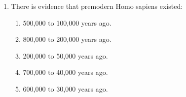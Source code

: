 \documentclass[12pt]{article}
\begin{document}
\begin{enumerate}[label=\arabic*.]
\begin{enumerate}[label=(\alph*)]
    \item Mousterian technology was focused on the production of scrapers.
    \item Aurignacian technology was primarily used for creating stone tools.
    \item Aurignacian technology was less advanced than Mousterian technology.
    \item Mousterian technology produced more usable blade surface.
    \item Aurignacian technology produced more usable blade surface.
\end{enumerate}
\item There is evidence that premodern Homo sapiens existed:
\begin{enumerate}[label=(\alph*)]
    \item 500,000 to 100,000 years ago.
    \item 800,000 to 200,000 years ago.
    \item 200,000 to 50,000 years ago.
    \item 700,000 to 40,000 years ago.
    \item 600,000 to 30,000 years ago.
\end{enumerate}
\end{enumerate}
\end{document}

